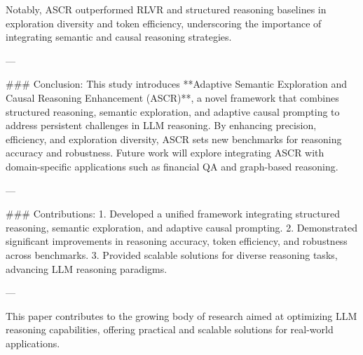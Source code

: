 Notably, ASCR outperformed RLVR and structured reasoning baselines in exploration diversity and token efficiency, underscoring the importance of integrating semantic and causal reasoning strategies.

---

### Conclusion:
This study introduces **Adaptive Semantic Exploration and Causal Reasoning Enhancement (ASCR)**, a novel framework that combines structured reasoning, semantic exploration, and adaptive causal prompting to address persistent challenges in LLM reasoning. By enhancing precision, efficiency, and exploration diversity, ASCR sets new benchmarks for reasoning accuracy and robustness. Future work will explore integrating ASCR with domain-specific applications such as financial QA and graph-based reasoning.

---

### Contributions:
1. Developed a unified framework integrating structured reasoning, semantic exploration, and adaptive causal prompting.
2. Demonstrated significant improvements in reasoning accuracy, token efficiency, and robustness across benchmarks.
3. Provided scalable solutions for diverse reasoning tasks, advancing LLM reasoning paradigms.

--- 

This paper contributes to the growing body of research aimed at optimizing LLM reasoning capabilities, offering practical and scalable solutions for real-world applications.